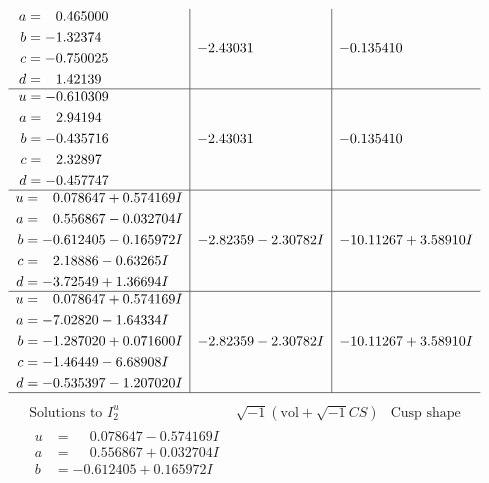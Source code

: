 \documentclass[1p]{elsarticle_modified}
\theoremstyle{definition}
\newcommand{\I}{\sqrt{-1}}
\begin{document}
$$\begin{array}{c|c|c}
\begin{aligned}
a &= \phantom{-}0.465000\phantom{ +0.000000I} \\
b &= -1.32374\phantom{ +0.000000I} \\
c &= -0.750025\phantom{ +0.000000I} \\
d &= \phantom{-}1.42139\phantom{ +0.000000I}\end{aligned}
 & -2.43031\phantom{ +0.000000I} & -0.135410\phantom{ +0.000000I} \\ \hline\begin{aligned}
u &= -0.610309\phantom{ +0.000000I} \\
a &= \phantom{-}2.94194\phantom{ +0.000000I} \\
b &= -0.435716\phantom{ +0.000000I} \\
c &= \phantom{-}2.32897\phantom{ +0.000000I} \\
d &= -0.457747\phantom{ +0.000000I}\end{aligned}
 & -2.43031\phantom{ +0.000000I} & -0.135410\phantom{ +0.000000I} \\ \hline\begin{aligned}
u &= \phantom{-}0.078647 + 0.574169 I \\
a &= \phantom{-}0.556867 - 0.032704 I \\
b &= -0.612405 - 0.165972 I \\
c &= \phantom{-}2.18886 - 0.63265 I \\
d &= -3.72549 + 1.36694 I\end{aligned}
 & -2.82359 - 2.30782 I & -10.11267 + 3.58910 I \\ \hline\begin{aligned}
u &= \phantom{-}0.078647 + 0.574169 I \\
a &= -7.02820 - 1.64334 I \\
b &= -1.287020 + 0.071600 I \\
c &= -1.46449 - 6.68908 I \\
d &= -0.535397 - 1.207020 I\end{aligned}
 & -2.82359 - 2.30782 I & -10.11267 + 3.58910 I\\
 \hline 
 \end{array}$$\newpage$$\begin{array}{c|c|c}  
\text{Solutions to }I^u_{2}& \I (\text{vol} + \sqrt{-1}CS) & \text{Cusp shape}\\
 \hline 
\begin{aligned}
u &= \phantom{-}0.078647 - 0.574169 I \\
a &= \phantom{-}0.556867 + 0.032704 I \\
b &= -0.612405 + 0.165972 I \\

\end{aligned}
\end{array}$$
\end{document}
